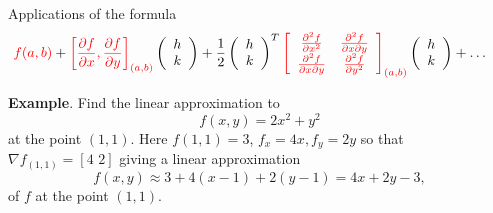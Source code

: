 \documentclass{article}
\begin{document}
%
%
%
%


Applications of the formula
{\small
$$
\hspace{-.5cm}
\textcolor{red}{f(a,b)} + \textcolor{red}{\left[ \frac{\partial f}{\partial x}, 
\frac{\partial f}{\partial y} \right]_{(a,b)}} \left( \begin{array}{c} h\\k \end{array} \right) + \frac{1}{2} \left( \begin{array}{c} h\\k \end{array} \right)^T \textcolor{red}{\left[ \begin{array}{cc}
\frac{\partial ^2 f}{\partial x ^2} & \frac{\partial ^2 f}{\partial x \partial y}\\\frac{\partial ^2 f}{\partial x \partial y} & \frac{\partial ^2 f}{\partial y ^2} \end{array} \right]_{(a,b)} }\left( \begin{array}{c} h\\k \end{array} \right) + \ldots 
$$
}

\textbf{Example}. Find the linear approximation to
$$
f(x,y)=2x^2+y^2
$$
at the point $(1,1)$. Here $f(1,1) = 3$, $f_x = 4x, f_y = 2y$ so that $\nabla f_{(1,1)} =[4 \,\, 2]$ giving a linear approximation
$$
f (x,y) \approx 3+ 4(x-1)+ 2(y-1)=4x+2y-3,
$$
of $f$ at the point $(1,1)$.
\end{document}
